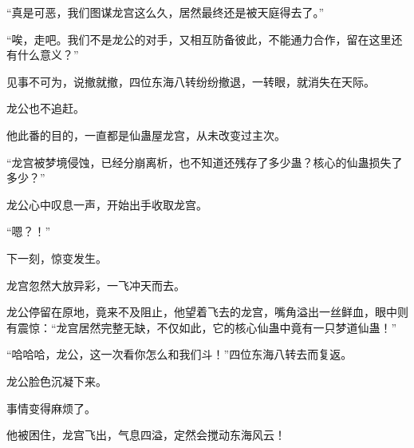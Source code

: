 \begin{this_body}
“真是可恶，我们图谋龙宫这么久，居然最终还是被天庭得去了。”

“唉，走吧。我们不是龙公的对手，又相互防备彼此，不能通力合作，留在这里还有什么意义？”

见事不可为，说撤就撤，四位东海八转纷纷撤退，一转眼，就消失在天际。

龙公也不追赶。

他此番的目的，一直都是仙蛊屋龙宫，从未改变过主次。

“龙宫被梦境侵蚀，已经分崩离析，也不知道还残存了多少蛊？核心的仙蛊损失了多少？”

龙公心中叹息一声，开始出手收取龙宫。

“嗯？！”

下一刻，惊变发生。

龙宫忽然大放异彩，一飞冲天而去。

龙公停留在原地，竟来不及阻止，他望着飞去的龙宫，嘴角溢出一丝鲜血，眼中则有震惊：“龙宫居然完整无缺，不仅如此，它的核心仙蛊中竟有一只梦道仙蛊！”

“哈哈哈，龙公，这一次看你怎么和我们斗！”四位东海八转去而复返。

龙公脸色沉凝下来。

事情变得麻烦了。

他被困住，龙宫飞出，气息四溢，定然会搅动东海风云！

\end{this_body}

